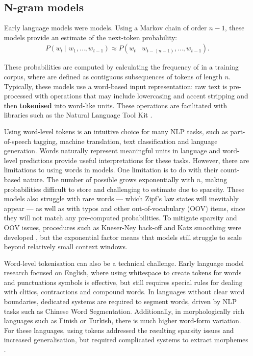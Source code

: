 \subsection{N-gram models}\label{sec:12-ngrams}

Early language models were \ngram models. Using a Markov chain of order $n-1$, these models provide an estimate of the next-token probability:
\begin{align}
    P\left(w_t \mid w_1, \dots, w_{t-1} \right) \approx P\left(w_t \mid w_{t-(n-1)}, \dots, w_{t-1}\right).\label{eq:ngram}
\end{align}

These probabilities are computed by calculating the frequency of \ngrams in a training corpus, where \ngrams are defined as contiguous subsequences of tokens of length $n$. Typically, these models use a word-based input representation: raw text is pre-processed with operations that may include lowercasing and accent stripping and then \textbf{tokenised} into word-like units. These operations are facilitated with libraries such as the Natural Language Tool Kit \citep[NLTK;][]{bird2009nltk}. 

Using word-level tokens is an intuitive choice for many NLP tasks, such as part-of-speech tagging, machine translation, text classification and language generation. Words naturally represent meaningful units in language and word-level predictions provide useful interpretations for these tasks. However, there are limitations to using words in \ngram models. One limitation is to do with their count-based nature. The number of possible \ngrams grows exponentially with $n$, making probabilities difficult to store and challenging to estimate due to sparsity. These models also struggle with rare words --- which Zipf's law states will inevitably appear \citep{zipf_human_1949} --- as well as with typos and other out-of-vocabulary (OOV) items, since they will not match any pre-computed \ngram probabilities. To mitigate sparsity and OOV issues, procedures such as Kneser-Ney back-off and Katz smoothing were developed \citep{ney1994structuring, katz2003estimation}, but the exponential factor means that \ngram models still struggle to scale beyond relatively small context windows.

Word-level tokenisation can also be a technical challenge. Early language model research focused on English, where using whitespace to create tokens for words and punctuations symbols is effective, but still requires special rules for dealing with clitics, contractions and compound words. In languages without clear word boundaries, dedicated systems are required to segment words, driven by NLP tasks such as Chinese Word Segmentation. Additionally, in morphologically rich languages such as Finish or Turkish, there is much higher word-form variation. For these languages, using  tokens addressed the resulting sparsity issues and increased generalisation, but required complicated systems to extract morphemes \citep{creutz2005unsupervised,habash2009}. %

